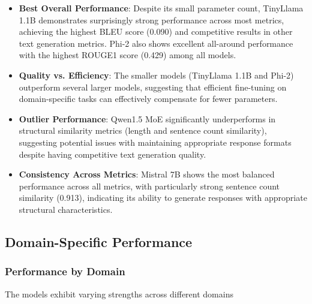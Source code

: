 \documentclass[11pt]{article}
\begin{document}
\begin{itemize}
\item \textbf{Best Overall Performance}: Despite its small parameter count, TinyLlama 1.1B demonstrates surprisingly strong performance across most metrics, achieving the highest BLEU score (0.090) and competitive results in other text generation metrics. Phi-2 also shows excellent all-around performance with the highest ROUGE1 score (0.429) among all models.

\item \textbf{Quality vs. Efficiency}: The smaller models (TinyLlama 1.1B and Phi-2) outperform several larger models, suggesting that efficient fine-tuning on domain-specific tasks can effectively compensate for fewer parameters.

\item \textbf{Outlier Performance}: Qwen1.5 MoE significantly underperforms in structural similarity metrics (length and sentence count similarity), suggesting potential issues with maintaining appropriate response formats despite having competitive text generation quality.

\item \textbf{Consistency Across Metrics}: Mistral 7B shows the most balanced performance across all metrics, with particularly strong sentence count similarity (0.913), indicating its ability to generate responses with appropriate structural characteristics.
\end{itemize}

\subsection{Domain-Specific Performance}

\subsubsection{Performance by Domain}

The models exhibit varying strengths across different domains
\end{document}
